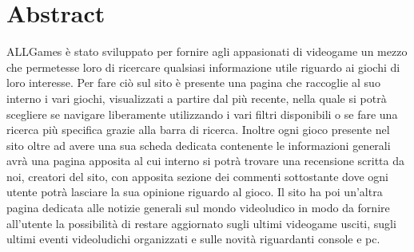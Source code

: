 \section*{Abstract}

ALLGames è stato sviluppato per fornire agli appasionati di videogame un mezzo che permetesse loro di ricercare qualsiasi informazione utile riguardo ai giochi di loro interesse.
Per fare ciò sul sito è presente una pagina che raccoglie al suo interno i vari giochi, visualizzati a partire dal più recente, nella quale si potrà scegliere se navigare liberamente utilizzando i vari filtri disponibili o se fare una ricerca più specifica grazie alla barra di ricerca.
Inoltre ogni gioco presente nel sito oltre ad avere una sua scheda dedicata contenente le informazioni generali avrà una pagina apposita al cui interno si potrà trovare una recensione scritta da noi, creatori del sito, con apposita sezione dei commenti sottostante dove ogni utente potrà lasciare la sua opinione riguardo al gioco.
Il sito ha poi un'altra pagina dedicata alle notizie generali sul mondo videoludico in modo da fornire all'utente la possibilità di restare aggiornato sugli ultimi videogame usciti, sugli ultimi eventi videoludichi organizzati e sulle novità riguardanti console e pc.